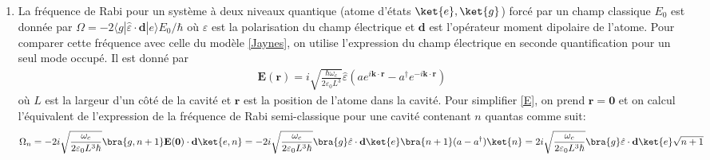{\begin{enumerate}
\begin{align}
        \ket{\Psi} = (A \cos(\Omega t) + B \sin(\Omega t)) e^{-i\omega_c k t}\ket{g, n+1} + (C \cos(\Omega t) + D \sin(\Omega t))e^{-i\omega_c (k+1) t}\ket{e, n} \label{sol} 
    \end{align}
    Les valeurs initiales des composantes imposent $A = 1, C = 0$ et les valeurs initiales de leurs dérivées imposent $B = 0, D = -i$ ce qui nous laisse la solution 
    \begin{align*}
        \ket{\Psi} = \cos(\Omega t) e^{-i\omega_c k t}\ket{g, n+1} - i \sin(\Omega t) e^{-i\omega_c (k+1) t}\ket{e, n} 
    \end{align*}
    Qui est bien normalisée. La probabilité de mesurer l'atome dans son état excité au temps $t$ est donnée par $P_{g, n+1 \to e, n} = |\bra{e, n}\ket{\Psi}|^2 = \sin^2(\Omega t)$ ce qui confirme que $\Omega$ correspond à une fréquence de Rabi.
    \item La fréquence de Rabi pour un système à deux niveaux quantique (atome d'états $\ket{e}, \ket{g}$) forcé par un champ classique $E_0$ est donnée par $\Omega=-2\langle g|\hat{\varepsilon} \cdot \mathbf{d}| e\rangle E_0 / \hbar$ où $\hat{\varepsilon}$ est la polarisation du champ électrique et $\mathbf{d}$ est l'opérateur moment dipolaire de l'atome. Pour comparer cette fréquence avec celle du modèle \eqref{Jaynes}, on utilise l'expression du champ électrique en seconde quantification pour un seul mode occupé. Il est donné par 
    \begin{align}
        \mathbf{E}(\mathbf{r})=i \sqrt{\frac{\hbar \omega_c}{2 \varepsilon_0 L^3}} \hat{\varepsilon}\left(a e^{i \mathbf{k} \cdot \mathbf{r}}-a^{\dagger} e^{-i \mathbf{k} \cdot \mathbf{r}}\right)\label{E}
    \end{align}
    où $L$ est la largeur d'un côté de la cavité et $\mathbf{r}$ est la position de l'atome dans la cavité. Pour simplifier \eqref{E}, on prend $\mathbf{r}= \mathbf{0}$ et on calcul l'équivalent de l'expression de la fréquence de Rabi semi-classique pour une cavité contenant $n$ quantas comme suit:
    \begin{align}
        \Omega_n = -2 i \sqrt{\frac{\omega_c}{2 \varepsilon_0 L^3 \hbar}} \bra{g, n + 1} \mathbf{E}(\mathbf{0}) \cdot \mathbf{d} \ket{e, n} = -2i \sqrt{\frac{\omega_c}{2 \varepsilon_0 L^3 \hbar}} \bra{g} \hat{\varepsilon} \cdot \mathbf{d} \ket{e} \bra{n+1} (a-a^{\dagger}) \ket{n} = 2i \sqrt{\frac{\omega_c}{2 \varepsilon_0 L^3\hbar }} \bra{g} \hat{\varepsilon} \cdot \mathbf{d} \ket{e} \sqrt{n+1} \label{E2}
    \end{align}

\end{enumerate}}
